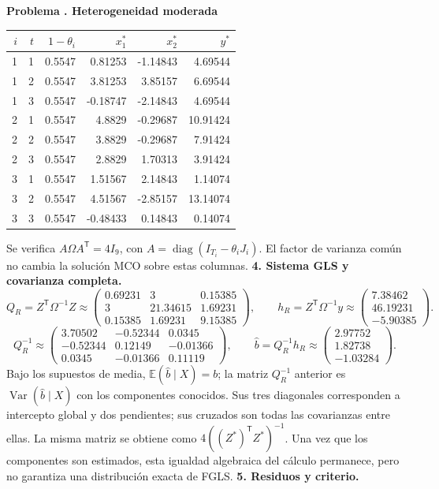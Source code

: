 \documentclass[11pt,a4paper]{article}
\newcommand{\E}{\mathbb E}
\newcommand{\T}{^{\mathsf T}}
\DeclareMathOperator{\Var}{Var}
\DeclareMathOperator{\diag}{diag}
\theoremstyle{definition}
\newcounter{problema}
\newenvironment{resuelto}[1]{\refstepcounter{problema}\par\medskip\Needspace{6\baselineskip}\textbf{Problema \theproblema. #1}\par}{\par\medskip}
\begin{document}
\begin{resuelto}{Heterogeneidad moderada}
\begin{center}\small
\begin{tabular}{rrrrrr}
\toprule
$i$&$t$&$1-\theta_i$&$x_1^*$&$x_2^*$&$y^*$\\
\midrule
1&1&0.5547&0.81253&-1.14843&4.69544\\
1&2&0.5547&3.81253&3.85157&6.69544\\
1&3&0.5547&-0.18747&-2.14843&4.69544\\
2&1&0.5547&4.8829&-0.29687&10.91424\\
2&2&0.5547&3.8829&-0.29687&7.91424\\
2&3&0.5547&2.8829&1.70313&3.91424\\
3&1&0.5547&1.51567&2.14843&1.14074\\
3&2&0.5547&4.51567&-2.85157&13.14074\\
3&3&0.5547&-0.48433&0.14843&0.14074\\
\bottomrule
\end{tabular}
\end{center}
Se verifica $A\Omega A\T=4I_{9}$, con $A=\diag(I_{T_i}-\theta_iJ_i)$. El factor de varianza común no cambia la solución MCO sobre estas columnas.
\textbf{4. Sistema GLS y covarianza completa.}
\[
Q_R=Z\T\Omega^{-1}Z\approx\begin{pmatrix}
0.69231&3&0.15385\\3&21.34615&1.69231\\0.15385&1.69231&9.15385
\end{pmatrix},\qquad h_R=Z\T\Omega^{-1}y\approx\begin{pmatrix}
7.38462\\46.19231\\-5.90385
\end{pmatrix}.
\]
\[
Q_R^{-1}\approx\begin{pmatrix}
3.70502&-0.52344&0.0345\\-0.52344&0.12149&-0.01366\\0.0345&-0.01366&0.11119
\end{pmatrix},\qquad \widehat b=Q_R^{-1}h_R\approx\begin{pmatrix}
2.97752\\1.82738\\-1.03284
\end{pmatrix}.
\]
Bajo los supuestos de media, $\E(\widehat b\mid X)=b$; la matriz $Q_R^{-1}$ anterior es $\Var(\widehat b\mid X)$ con los componentes conocidos. Sus tres diagonales corresponden a intercepto global y dos pendientes; sus cruzados son todas las covarianzas entre ellas.
La misma matriz se obtiene como $4((Z^*)\T Z^*)^{-1}$. Una vez que los componentes son estimados, esta igualdad algebraica del cálculo permanece, pero no garantiza una distribución exacta de FGLS.
\textbf{5. Residuos y criterio.}


\end{resuelto}
\end{document}
